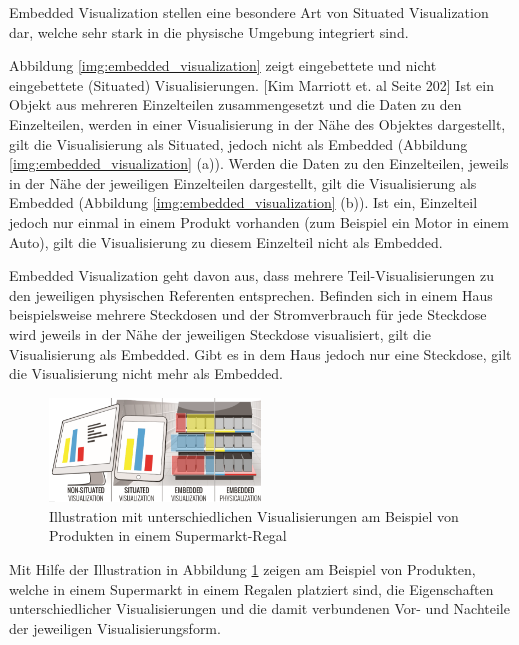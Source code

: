 \cite[S.~195]{ElSayedNevenA.M.BruceH.ThomasRossT.Smith2015} Embedded Visualization stellen eine besondere Art von Situated Visualization dar, welche sehr stark in die physische Umgebung integriert sind. 

Abbildung \ref{img:embedded_visualization} zeigt eingebettete und nicht eingebettete (Situated) Visualisierungen. [Kim Marriott et. al Seite 202] Ist ein Objekt aus mehreren Einzelteilen 
zusammengesetzt und die Daten zu den Einzelteilen, werden in einer Visualisierung in der Nähe des Objektes dargestellt, gilt die Visualisierung als Situated, jedoch nicht als Embedded (Abbildung \ref{img:embedded_visualization} (a)).
Werden die Daten zu den Einzelteilen, jeweils in der Nähe der jeweiligen Einzelteilen dargestellt, gilt die Visualisierung als Embedded (Abbildung \ref{img:embedded_visualization} (b)). Ist ein, Einzelteil jedoch nur einmal in einem Produkt vorhanden (zum Beispiel ein Motor in einem Auto), gilt die Visualisierung zu diesem Einzelteil nicht als Embedded. 

Embedded Visualization geht davon aus, dass mehrere Teil-Visualisierungen zu den jeweiligen physischen Referenten entsprechen. Befinden sich in einem Haus beispielsweise mehrere Steckdosen und der Stromverbrauch 
für jede Steckdose wird jeweils in der Nähe der jeweiligen Steckdose visualisiert, gilt die Visualisierung als Embedded. Gibt es in dem Haus jedoch nur eine Steckdose, gilt die Visualisierung nicht mehr als
Embedded.

\vspace{15mm} 
\begin{figure}[H]
	\centering
	\includegraphics[width=0.5\textwidth]{resources/fundamentals/situated_visualization/Illustration_situated_embedded_visualization.png}
	\caption{Illustration mit unterschiedlichen Visualisierungen am Beispiel von Produkten in einem Supermarkt-Regal}
	\label{img:Illustration_situated_embedded_visualization}
\end{figure}

Mit Hilfe der Illustration in Abbildung \ref{img:Illustration_situated_embedded_visualization} zeigen \cite{WesleyWillettYvonneJansen} am Beispiel von Produkten, 
welche in einem Supermarkt in einem Regalen platziert sind, die Eigenschaften unterschiedlicher Visualisierungen und die damit verbundenen Vor- und Nachteile der jeweiligen Visualisierungsform. 

